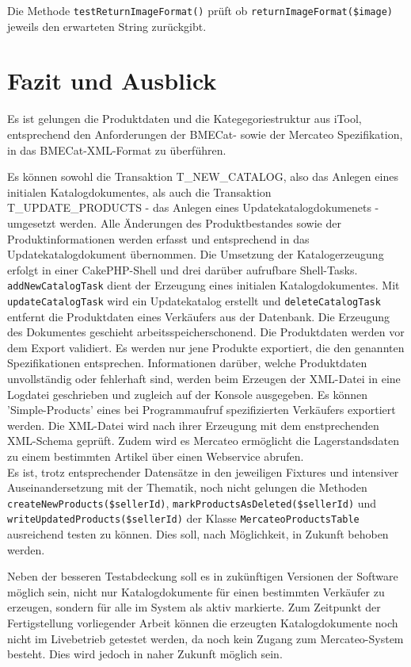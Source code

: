 {	Die Methode \texttt{testReturnImageFormat()} prüft ob \texttt{returnImageFormat(\$image)} jeweils den erwarteten String zurückgibt.
	
	\section{Fazit und Ausblick}
	
	Es ist gelungen die Produktdaten und die Kategegoriestruktur aus iTool, entsprechend den Anforderungen der BMECat- sowie der Mercateo Spezifikation, in das BMECat-XML-Format zu überführen. 
	
	Es können sowohl die Transaktion T\_NEW\_CATALOG, also das Anlegen eines initialen Katalogdokumentes, als auch die Transaktion T\_UPDATE\_PRODUCTS - das Anlegen eines Updatekatalogdokumenets - umgesetzt werden. 
	Alle Änderungen des Produktbestandes sowie der Produktinformationen werden erfasst und entsprechend in das Updatekatalogdokument übernommen.
	Die Umsetzung der Katalogerzeugung erfolgt in einer CakePHP-Shell und drei darüber aufrufbare Shell-Tasks. \texttt{addNewCatalogTask} dient der Erzeugung eines initialen Katalogdokumentes. Mit
	\texttt{updateCatalogTask} wird ein Updatekatalog erstellt und \texttt{deleteCatalogTask} entfernt die Produktdaten eines Verkäufers aus der Datenbank.
	Die Erzeugung des Dokumentes geschieht arbeitsspeicherschonend.
	Die Produktdaten werden vor dem Export validiert. Es werden nur jene Produkte exportiert, die den genannten Spezifikationen entsprechen. Informationen darüber, welche Produktdaten unvollständig oder fehlerhaft sind, werden beim Erzeugen der XML-Datei in eine Logdatei geschrieben und zugleich auf der Konsole ausgegeben. Es können 'Simple-Products' eines bei Programmaufruf spezifizierten Verkäufers exportiert werden. Die XML-Datei wird nach ihrer Erzeugung mit dem enstprechenden XML-Schema geprüft. 
	Zudem wird es Mercateo ermöglicht die Lagerstandsdaten zu einem bestimmten Artikel über einen Webservice abrufen. \\
	
	Es ist, trotz entsprechender Datensätze in den jeweiligen Fixtures und intensiver Auseinandersetzung mit der Thematik, noch nicht gelungen die Methoden \texttt{createNewProducts(\$sellerId)}, \texttt{markProductsAsDeleted(\$sellerId)} und \texttt{writeUpdatedProducts(\$sellerId)} der Klasse \texttt{MercateoProductsTable} ausreichend testen zu können. Dies soll, nach Möglichkeit, in Zukunft behoben werden.
	
	Neben der besseren Testabdeckung soll es in zukünftigen Versionen der Software möglich sein, nicht nur Katalogdokumente für einen bestimmten Verkäufer zu erzeugen, sondern für alle im System als aktiv markierte.
	Zum Zeitpunkt der Fertigstellung vorliegender Arbeit können die erzeugten Katalogdokumente noch nicht im Livebetrieb getestet werden, da noch kein Zugang zum Mercateo-System besteht. Dies wird jedoch in naher Zukunft möglich sein.
	


}
